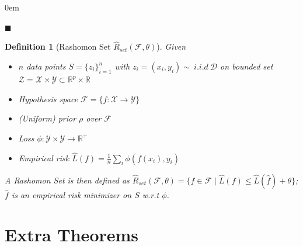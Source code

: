 \documentclass[12pt]{article}
\renewcommand{\qed}{\hfill$\blacksquare$}
\renewenvironment{proof}{\begin{addmargin}[1em]{0em}\begin{newproof}}{\end{newproof}\end{addmargin}\qed}
\newtheorem{definition}{Definition}
\begin{document}
\begin{proof}


 \end{proof}
% 




\pagebreak

  \begin{definition}[Rashomon Set $\hat{R}_{set}(\mathcal{F}, \theta)$]
        Given 
        \begin{itemize}
            \item $n$ data points $S = \{z_i\}_{i=1}^n$ with $z_i=(x_i,y_i)\sim \ i.i.d \ \mathcal{D}$ on bounded set $\mathcal{Z} = \mathcal{X}\times \mathcal{Y} \subset \mathbb{R}^p \times \mathbb{R}$
            \item Hypothesis space $\mathcal{F} = \{f:\mathcal{X}\rightarrow \mathcal{Y}\}$
            \item (Uniform) prior $\rho$ over $\mathcal{F}$
            \item Loss $\phi:\mathcal{Y}\times \mathcal{Y}\rightarrow \mathbb{R}^+$
            \item Empirical risk $\hat{L}(f) = \frac{1}{n}\sum_i \phi(f(x_i),y_i)$
        \end{itemize}

        A \emph{Rashomon Set} is then defined as $\hat{R}_{set}(\mathcal{F}, \theta) = \{f \in \mathcal{F} \mid \hat{L}(f) \leq \hat{L}(\hat{f})+\theta\}$; $\hat{f}$ is an empirical risk minimizer on $S$ w.r.t $\phi$. 
    \end{definition}

\bigskip


\section{Extra Theorems}
\end{document}
